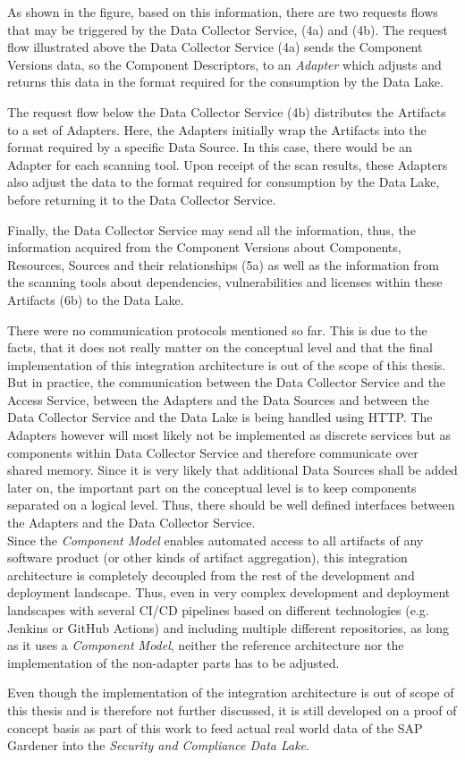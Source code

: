 As shown in the figure, based on this information, there are two requests flows that may be triggered by the Data Collector Service, (4a) and (4b). The request flow illustrated above the Data Collector Service (4a) sends the Component Versions data, so the Component Descriptors, to an \emph{Adapter} which adjusts and returns this data in the format required for the consumption by the Data Lake.\par 
The request flow below the Data Collector Service (4b) distributes the Artifacts to a set of Adapters. Here, the Adapters initially wrap the Artifacts into the format required by a specific Data Source. In this case, there would be an Adapter for each scanning tool. Upon receipt of the scan results, these Adapters also adjust the data to the format required for consumption by the Data Lake, before returning it to the Data Collector Service.\par 
Finally, the Data Collector Service may send all the information, thus, the information acquired from the Component Versions about Components, Resources, Sources and their relationships (5a) as well as the information from the scanning tools about dependencies, vulnerabilities and licenses within these Artifacts (6b) to the Data Lake.\par
There were no communication protocols mentioned so far. This is due to the facts, that it does not really matter on the conceptual level and that the final implementation of this integration architecture is out of the scope of this thesis. But in practice, the communication between the Data Collector Service and the Access Service, between the Adapters and the Data Sources and between the Data Collector Service and the Data Lake is being handled using HTTP. The Adapters however will most likely not be implemented as discrete services but as components within Data Collector Service and therefore communicate over shared memory. Since it is very likely that additional Data Sources shall be added later on, the important part on the conceptual level is to keep components separated on a logical level. Thus, there should be well defined interfaces between the Adapters and the Data Collector Service.\\

Since the \emph{Component Model} enables automated access to all artifacts of any software product (or other kinds of artifact aggregation), this integration architecture is completely decoupled from the rest of the development and deployment landscape. Thus, even in very complex development and deployment landscapes with several CI/CD pipelines based on different technologies (e.g. Jenkins or GitHub Actions) and including multiple different repositories, as long as it uses a \emph{Component Model}, neither the reference architecture nor the implementation of the non-adapter parts has to be adjusted.\par
Even though the implementation of the integration architecture is out of scope of this thesis and is therefore not further discussed, it is still developed on a proof of concept basis as part of this work to feed actual real world data of the SAP Gardener into the \emph{Security and Compliance Data Lake}.

